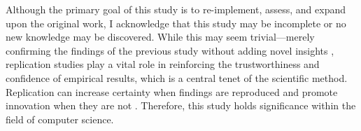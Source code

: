 \vspace{\baselineskip}
Although the primary goal of this study is to re-implement, assess, and expand upon the original work, I acknowledge that this study may be incomplete or no new knowledge may be discovered. While this may seem trivial—merely confirming the findings of the previous study without adding novel insights \cite{hendriksConsiderItParsed}, replication studies play a vital role in reinforcing the trustworthiness and confidence of empirical results, which is a central tenet of the scientific method. Replication can increase certainty when findings are reproduced and promote innovation when they are not \cite{shepperdReplicationStudiesConsidered2018}. Therefore, this study holds significance within the field of computer science.





